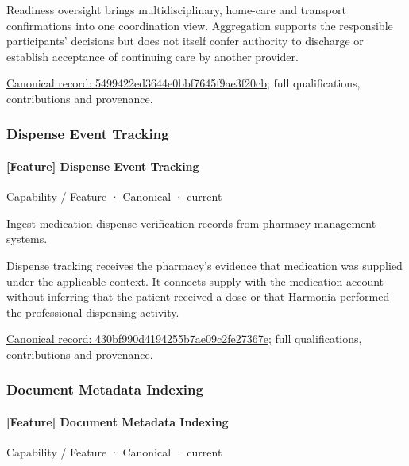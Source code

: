 Readiness oversight brings multidisciplinary, home-care and transport confirmations into one coordination view. Aggregation supports the responsible participants' decisions but does not itself confer authority to discharge or establish acceptance of continuing care by another provider.


{\footnotesize \href{../../../../continuum/strategy/capability/feature/5499422ed3644e0bbf7645f9ae3f20cb.md}{Canonical record: 5499422ed3644e0bbf7645f9ae3f20cb}; full qualifications, contributions and provenance.}\par
\subsubsection{Dispense Event Tracking}

\paragraph{[Feature] Dispense Event Tracking}

\label{element:430bf990d4194255b7ae09c2fe27367e}
{\small Capability / Feature · Canonical · current}\par

Ingest medication dispense verification records from pharmacy management systems.



Dispense tracking receives the pharmacy's evidence that medication was supplied under the applicable context. It connects supply with the medication account without inferring that the patient received a dose or that Harmonia performed the professional dispensing activity.


{\footnotesize \href{../../../../continuum/strategy/capability/feature/430bf990d4194255b7ae09c2fe27367e.md}{Canonical record: 430bf990d4194255b7ae09c2fe27367e}; full qualifications, contributions and provenance.}\par
\subsubsection{Document Metadata Indexing}

\paragraph{[Feature] Document Metadata Indexing}

\label{element:0c85a269e90a4329b83d934f9061cd49}
{\small Capability / Feature · Canonical · current}\par


